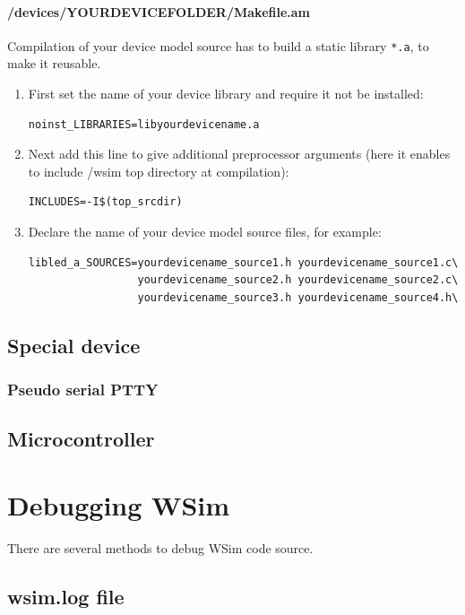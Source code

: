 \documentclass[a4paper,10pt]{report}
\begin{document}
\subsubsection{/devices/YOURDEVICEFOLDER/Makefile.am}
Compilation of your device model source has to build a static library \verb$*.a$, to make it reusable.
\begin{enumerate}
  \item First set the name of your device library and require it not be installed:
\begin{verbatim}
noinst_LIBRARIES=libyourdevicename.a
\end{verbatim}

  \item Next add this line to give additional preprocessor arguments (here it enables to include /wsim top directory at compilation):
\begin{verbatim}
INCLUDES=-I$(top_srcdir)
\end{verbatim}

  \item Declare the name of your device model source files, for example:
\begin{verbatim}
libled_a_SOURCES=yourdevicename_source1.h yourdevicename_source1.c\
                 yourdevicename_source2.h yourdevicename_source2.c\
                 yourdevicename_source3.h yourdevicename_source4.h\
\end{verbatim}

\end{enumerate}

\section{Special device}
\subsection{Pseudo serial PTTY}


\section{Microcontroller}


\chapter{Debugging WSim}

There are several methods to debug WSim code source.

\section{wsim.log file}
\end{document}
